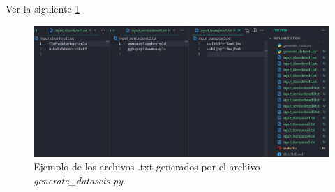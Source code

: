 Ver la siguiente \cref{fig:ejemplo-datasets}
\begin{figure}[H]
    \centering
    \includegraphics[width=1\linewidth]{Tarea_2&3//images/ejemplo_datasets.png}
    \caption{Ejemplo de los archivos .txt generados por el archivo \textit{generate\_datasets.py}.}
    \label{fig:ejemplo-datasets}
\end{figure}
